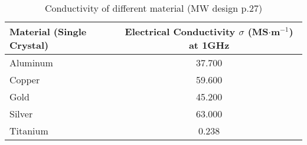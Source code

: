 \begin{table}
\caption{Conductivity of different material (MW design p.27)}
\label{tab:conductivity}
\begin{tabular}{l|c}
\toprule
Material (Single Crystal) & \makecell{Electrical Conductivity\\$\sigma$ (MS$\cdot$m$^{-1}$) at 1GHz} \\
\midrule
\hline
Aluminum & 37.700 \\
Copper & 59.600 \\
Gold & 45.200 \\
Silver & 63.000 \\
Titanium & 0.238 \\
\bottomrule
\end{tabular}
\end{table}